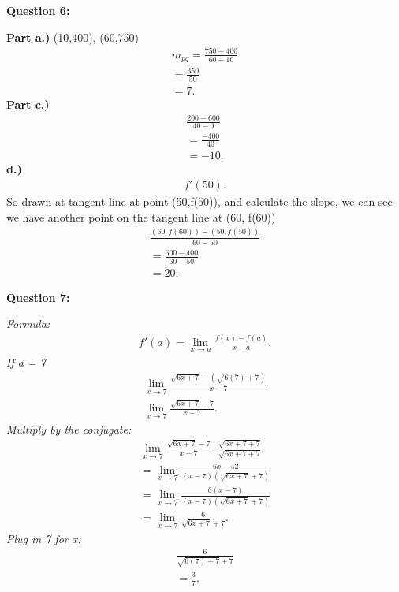 \documentclass{report}
\begin{document}
    \bigbreak \noindent \bigbreak \noindent \bigbreak \noindent 
    \begin{Large}
        \textbf{Question 6:}
    \end{Large}
    \bigbreak \noindent 
    \bigbreak \noindent 
    \textbf{Part a.)}
    (10,400), (60,750)
    \begin{align*}
        m_{pq} = \frac{750-400}{60-10} \\
        = \frac{350}{50} \\ 
        = 7
    .\end{align*}
    \bigbreak \noindent 
    \textbf{Part c.)}
    \begin{align*}
        \frac{200-600}{40-0} \\ 
        = \frac{-400}{40} \\ 
        = -10
    .\end{align*}
    \bigbreak \noindent 
    \textbf{d.)}
    \begin{align*}
        f\prime (50)
    .\end{align*}
    \bigbreak \noindent 
    So drawn at tangent line at point (50,f(50)), and calculate the slope, we can see we have another point on the tangent line
    at (60, f(60))
    \begin{align*}
        \frac{(60,f(60)) - (50,f(50))}{60-50} \\ 
        = \frac{600-400}{60-50} \\ 
        = 20
    .\end{align*}


    \bigbreak \noindent \bigbreak \noindent \bigbreak \noindent 
    \begin{Large}
        \textbf{Question 7:}
    \end{Large}
    \bigbreak \noindent 
    \bigbreak \noindent 
    \textit{Formula:}
    \begin{align*}
        f\prime (a) = \lim\limits_{x \to a}{ \frac{f(x) - f(a)}{x-a}}
    .\end{align*}
    \bigbreak \noindent 
    \textit{If a = 7}
    \begin{align*}
        \lim\limits_{x \to 7}{ \frac{ \sqrt{6x+7} - ( \sqrt{6(7)+7})}{x-7}} \\
        \lim\limits_{x \to 7}{ \frac{ \sqrt{6x+7} - 7}{x-7}}
    .\end{align*}
    \bigbreak \noindent 
    \textit{Multiply by the conjugate:}
    \begin{align*}
        \lim\limits_{x \to 7}{ \frac{ \sqrt{6x+7} -7}{x-7}} \cdot \frac{ \sqrt{6x+7+7}}{ \sqrt{6x+7+7}} \\
        = \lim\limits_{x \to 7}{ \frac{6x-42}{(x-7) ( \sqrt{6x+7} + 7)}} \\
        = \lim\limits_{x \to 7}{ \frac{6(x-7)}{(x-7) ( \sqrt{6x+7} + 7)}} \\
        = \lim\limits_{x \to 7}{ \frac{6}{ \sqrt{6x+7}+7}}
    .\end{align*}
    \bigbreak \noindent 
    \textit{Plug in 7 for x:}
    \begin{align*}
        \frac{6}{ \sqrt{6(7)+7}+7} \\
        = \frac{3}{7}
    .\end{align*}
\end{document}
